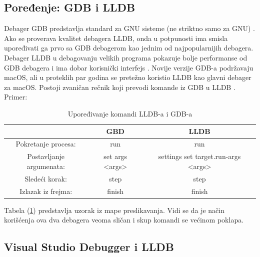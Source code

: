 \documentclass[a4paper]{article}
\begin{document}
\subsection{Poređenje: GDB i LLDB}
\label{subsec: GDB i LLDB}

Debager GDB predstavlja standard za GNU sisteme (ne striktno samo za GNU) \cite{gdb}. Ako se proverava kvalitet debagera LLDB, onda u potpunosti ima smisla upoređivati ga prvo sa GDB debagerom kao jednim od najpopularnijih debagera. Debager LLDB u debagovanju velikih programa pokazuje bolje performanse od GDB debagera i ima dobar korisnički interfejs \cite{lldb_project_blog}. Novije verzije GDB-a podržavaju macOS, ali u proteklih par godina se pretežno koristio LLDB kao glavni debager za macOS. Postoji zvaničan rečnik koji prevodi komande iz GDB u LLDB \cite {lldb_to_gdb_map}. Primer:

\begin{table}
	\begin{center}
	  \caption{Upoređivanje komandi LLDB-a i GDB-a}
	  \label{tab:tabela_lldb_i_gdb} 
	  \begin{tabular}{| c | c | c |}
	  	\hline
	    & \cellcolor{red!60}GBD & \cellcolor{red!60}LLDB \\ 
	    \hline
	    \cellcolor{orange!60}Pokretanje procesa: & \cellcolor{yellow!60}run & \cellcolor{yellow!60}run \\ 
	    \hline 
	    \cellcolor{orange!60}Postavljanje argumenata: & \cellcolor{yellow!60}set args <args>
	    & \cellcolor{yellow!60}settings set target.run-args <args> \\
	    \hline
	    \cellcolor{orange!60}Sledeći korak: & \cellcolor{yellow!60}step & \cellcolor{yellow!60}step \\
	    \hline
	    \cellcolor{orange!60}Izlazak iz frejma: & \cellcolor{yellow!60}finish & \cellcolor{yellow!60}finish\\
	    \hline
	  \end{tabular}
	\end{center}
\end{table}

\indent Tabela (\ref{tab:tabela_lldb_i_gdb}) predstavlja uzorak iz mape preslikavanja. Vidi se da je način korišćenja ova dva debagera veoma sličan i skup komandi se većinom poklapa. 

\subsection{Visual Studio Debugger i LLDB}
\label{subsec: Visual Studio Debugger i LLDB}
\end{document}
